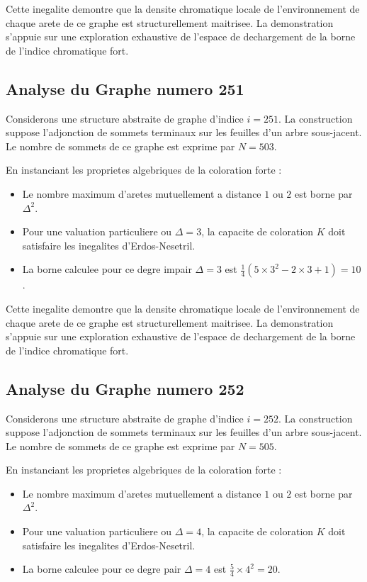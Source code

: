 \documentclass[11pt,a4paper]{article}
\begin{document}
Cette inegalite demontre que la densite chromatique locale de l'environnement de chaque arete de ce graphe est structurellement maitrisee. La demonstration s'appuie sur une exploration exhaustive de l'espace de dechargement de la borne de l'indice chromatique fort.

\subsection{Analyse du Graphe numero 251}
Considerons une structure abstraite de graphe d'indice $i = 251$. La construction suppose l'adjonction de sommets terminaux sur les feuilles d'un arbre sous-jacent. Le nombre de sommets de ce graphe est exprime par $N = 503$.

En instanciant les proprietes algebriques de la coloration forte :
\begin{itemize}
\item Le nombre maximum d'aretes mutuellement a distance $1$ ou $2$ est borne par $\Delta^2$.
\item Pour une valuation particuliere ou $\Delta = 3$, la capacite de coloration $K$ doit satisfaire les inegalites d'Erdos-Nesetril.
\item La borne calculee pour ce degre impair $\Delta = 3$ est $\frac{1}{4}(5 \times 3^2 - 2 \times 3 + 1) = 10$.
\end{itemize}

Cette inegalite demontre que la densite chromatique locale de l'environnement de chaque arete de ce graphe est structurellement maitrisee. La demonstration s'appuie sur une exploration exhaustive de l'espace de dechargement de la borne de l'indice chromatique fort.

\subsection{Analyse du Graphe numero 252}
Considerons une structure abstraite de graphe d'indice $i = 252$. La construction suppose l'adjonction de sommets terminaux sur les feuilles d'un arbre sous-jacent. Le nombre de sommets de ce graphe est exprime par $N = 505$.

En instanciant les proprietes algebriques de la coloration forte :
\begin{itemize}
\item Le nombre maximum d'aretes mutuellement a distance $1$ ou $2$ est borne par $\Delta^2$.
\item Pour une valuation particuliere ou $\Delta = 4$, la capacite de coloration $K$ doit satisfaire les inegalites d'Erdos-Nesetril.
\item La borne calculee pour ce degre pair $\Delta = 4$ est $\frac{5}{4} \times 4^2 = 20$.
\end{itemize}
\end{document}
